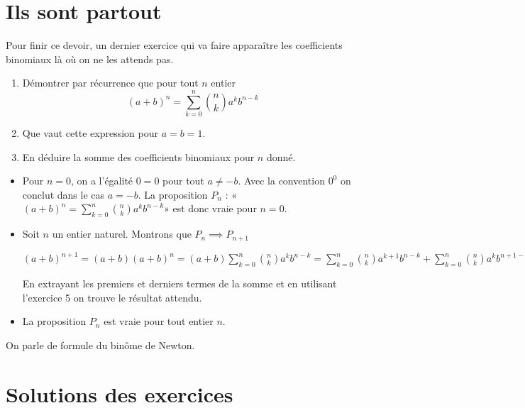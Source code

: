 \documentclass[12pt,a4paper,french]{article}
\makeatletter
\renewcommand{\maketitle}%
{\framebox{%
    \begin{minipage}{1.0\linewidth}%
      \begin{center}%
        \Large \@title ~-- \@author \\%
        \@date%
      \end{center}%
    \end{minipage}}%
  \normalsize%
}
\theoremstyle{break}
\theoremstyle{plain}
\theoremstyle{nonumberplain}
\theoremstyle{nonumberbreak}
\makeatother
\begin{document}
\section{Ils sont partout}

Pour finir ce devoir, un dernier exercice qui va faire apparaître les
coefficients binomiaux là où on ne les attends pas.

\begin{question}[ID=Newton]
  \begin{enumerate}
    \item Démontrer par récurrence que pour tout $n$ entier \[ (a + b)^n
      = \sum_{k = 0}^n \binom{n}{k} a^k b^{n - k} \]
    \item Que vaut cette expression pour $a = b = 1$.
    \item En déduire la somme des coefficients binomiaux pour $n$ donné.
  \end{enumerate}
\end{question}
\begin{solution}
  \begin{itemize}
    \item Pour $n =0$, on a l'égalité $0=0$ pour tout $a \neq -b$. Avec
      la convention $0^0$ on conclut dans le cas $a = -b$. La
      proposition $P_n$ : «$(a + b)^n = \sum_{k = 0}^n \binom{n}{k} a^k
      b^{n - k}$» est donc vraie pour $n =0$.
    \item Soit $n$ un entier naturel. Montrons que $P_n \implies
      P_{n+1}$

      $(a + b)^{n+1} = (a+b)(a + b)^n = (a+b)\sum_{k = 0}^n \binom{n}{k}
      a^k b^{n - k} = \sum_{k = 0}^n \binom{n}{k}a^{k+1}b^{n - k} +
      \sum_{k = 0}^n \binom{n}{k}a^k b^{n+1 - k}$

      En extrayant les premiers et derniers termes de la somme et
      en utilisant l'exercice 5 on trouve le résultat attendu.
    \item La proposition $P_n$ est vraie pour tout entier $n$.
  \end{itemize}
  On parle de formule du binôme de Newton.
\end{solution}

\pagebreak

\maketitle
\vspace{-0.5cm}

\section*{Solutions des exercices}

\vspace{-7mm}

\printsolutions
\end{document}
